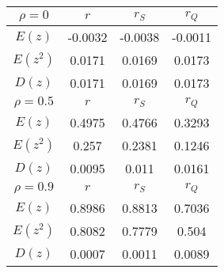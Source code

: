 \begin{tabular}{| c | c | c | c |} \hline
$\rho = 0$ & $r$ & $r_S$ & $r_Q$ \\ \hline 
$E(z)$ & -0.0032 & -0.0038 & -0.0011 \\ 
$E(z^2)$ & 0.0171 & 0.0169 & 0.0173 \\ 
$D(z)$ & 0.0171 & 0.0169 & 0.0173 \\ \hline 
$\rho = 0.5$ & $r$ & $r_S$ & $r_Q$ \\ \hline 
$E(z)$ & 0.4975 & 0.4766 & 0.3293 \\ 
$E(z^2)$ & 0.257 & 0.2381 & 0.1246 \\ 
$D(z)$ & 0.0095 & 0.011 & 0.0161 \\ \hline 
$\rho = 0.9$ & $r$ & $r_S$ & $r_Q$ \\ \hline 
$E(z)$ & 0.8986 & 0.8813 & 0.7036 \\ 
$E(z^2)$ & 0.8082 & 0.7779 & 0.504 \\ 
$D(z)$ & 0.0007 & 0.0011 & 0.0089 \\ \hline 
\end{tabular}